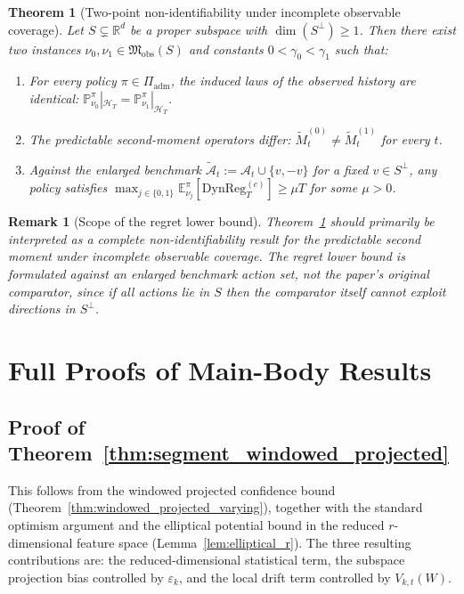 \documentclass{article}
\newcommand{\R}{\mathbb{R}}
\newcommand{\E}{\mathbb{E}}
\newcommand{\Prob}{\mathbb{P}}
\newcommand{\cA}{\mathcal{A}}
\newcommand{\cH}{\mathcal{H}}
\newcommand{\DynReg}{\mathrm{DynReg}}
\newtheorem{theorem}{Theorem}
\newtheorem{remark}{Remark}
\begin{document}
\begin{theorem}[Two-point non-identifiability under incomplete observable coverage]
\label{thm:two_point_testing_incomplete_coverage}
Let $S\subsetneq \R^d$ be a proper subspace with $\dim(S^\perp)\ge 1$.
Then there exist two instances $\nu_0,\nu_1 \in \mathfrak M_{\mathrm{obs}}(S)$ and constants $0<\gamma_0<\gamma_1$ such that:
\begin{enumerate}[label=(\roman*)]
    \item For every policy $\pi \in \Pi_{\mathrm{adm}}$, the induced laws of the observed history are identical: $\Prob_{\nu_0}^\pi|_{\cH_T} = \Prob_{\nu_1}^\pi|_{\cH_T}$.
    \item The predictable second-moment operators differ: $\widetilde{M}_t^{(0)} \ne \widetilde{M}_t^{(1)}$ for every $t$.
    \item Against the enlarged benchmark $\widetilde{\cA}_t := \cA_t \cup \{v, -v\}$ for a fixed $v \in S^\perp$, any policy satisfies $\max_{j\in\{0,1\}} \E_{\nu_j}^\pi[\DynReg_T^{(c)}] \ge \mu T$ for some $\mu > 0$.
\end{enumerate}
\end{theorem}

\begin{remark}[Scope of the regret lower bound]
\label{rem:scope_augmented_regret_lb}
Theorem~\ref{thm:two_point_testing_incomplete_coverage} should primarily be interpreted as a complete non-identifiability result for the predictable second moment under incomplete observable coverage. The regret lower bound is formulated against an enlarged benchmark action set, not the paper's original comparator, since if all actions lie in $S$ then the comparator itself cannot exploit directions in $S^\perp$.
\end{remark}

\section{Full Proofs of Main-Body Results}
\label{app:main_proofs}

\subsection{Proof of Theorem~\ref{thm:segment_windowed_projected}}

This follows from the windowed projected confidence bound (Theorem~\ref{thm:windowed_projected_varying}), together with the standard optimism argument and the elliptical potential bound in the reduced $r$-dimensional feature space (Lemma~\ref{lem:elliptical_r}).
The three resulting contributions are: the reduced-dimensional statistical term, the subspace projection bias controlled by $\varepsilon_k$, and the local drift term controlled by $V_{k,t}(W)$.
\end{document}
